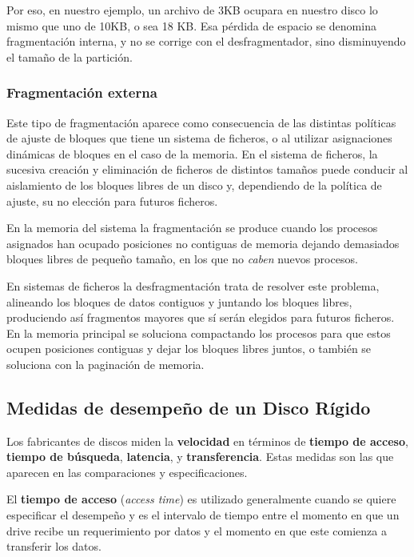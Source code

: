 \documentclass[10pt,a4paper]{article}
\begin{document}
Por eso, en nuestro ejemplo, un archivo de 3KB ocupara en nuestro disco lo mismo que uno de 10KB, o sea 18 KB. Esa pérdida de espacio se denomina fragmentación interna, y no se corrige con el desfragmentador, sino disminuyendo el tamaño de la partición.


\subsubsection{Fragmentación externa}
Este tipo de fragmentación aparece como consecuencia de las distintas políticas de ajuste de bloques que tiene un sistema de ficheros, o al utilizar asignaciones dinámicas de bloques en el caso de la memoria. En el sistema de ficheros, la sucesiva creación y eliminación de ficheros de distintos tamaños puede conducir al aislamiento de los bloques libres de un disco y, dependiendo de la política de ajuste, su no elección para futuros ficheros.

En la memoria del sistema la fragmentación se produce cuando los procesos asignados han ocupado posiciones no contiguas de memoria dejando demasiados bloques libres de pequeño tamaño, en los que no \textit{caben} nuevos procesos.

En sistemas de ficheros la desfragmentación trata de resolver este problema, alineando los bloques de datos contiguos y juntando los bloques libres, produciendo así fragmentos mayores que sí serán elegidos para futuros ficheros. En la memoria principal se soluciona compactando los procesos para que estos ocupen posiciones contiguas y dejar los bloques libres juntos, o también se soluciona con la paginación de memoria.

\subsection{Medidas de desempeño de un Disco Rígido}

Los fabricantes de discos miden la \textbf{velocidad} en términos de \textbf{tiempo de acceso}, \textbf{tiempo de búsqueda}, \textbf{latencia}, y \textbf{transferencia}. Estas medidas son las que aparecen en las comparaciones y especificaciones.

El \textbf{tiempo de acceso} (\textit{access time}) es utilizado generalmente cuando se quiere especificar el desempeño y es el intervalo de tiempo entre el momento en que un drive recibe un requerimiento por datos y el momento en que este comienza a transferir los datos.
\end{document}
